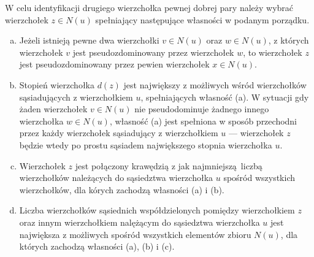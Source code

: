 {\begin{definition}
    W celu identyfikacji drugiego wierzchołka pewnej dobrej pary należy wybrać wierzchołek $z \in N(u)$ spełniający następujące własności w podanym porządku.
    \begin{enumerate}[(a)]
      \item Jeżeli istnieją pewne dwa wierzchołki $v \in N(u)$ oraz $w \in N(u)$, z których wierzchołek $v$ jest pseudozdominowany przez wierzchołek $w$, to wierzchołek $z$ jest pseudozdominowany przez pewien wierzchołek $x \in N(u)$.
      \item Stopień wierzchołka $d(z)$ jest największy z możliwych wśród wierzchołków sąsiadujących z wierzchołkiem $u$, spełniających własność (a).
      W sytuacji gdy żaden wierzchołek $v \in N(u)$ nie pseudodominuje żadnego innego wierzchołka $w \in N(u)$, własność (a) jest spełniona w sposób przechodni przez każdy wierzchołek sąsiadujący z wierzchołkiem $u$ --- wierzchołek $z$ będzie wtedy po prostu sąsiadem największego stopnia wierzchołka $u$.
      \item Wierzchołek $z$ jest połączony krawędzią z jak najmniejszą liczbą wierzchołków należących do sąsiedztwa wierzchołka $u$ spośród wszystkich wierzchołków, dla kórych zachodzą własności (a) i (b).
      \item Liczba wierzchołków sąsiednich współdzielonych pomiędzy wierzchołkiem $z$ oraz innym wierzchołkiem nalężącym do sąsiedztwa wierzchołka $u$ jest największa z możliwych spośród wszystkich elementów zbioru $N(u)$, dla których zachodzą własności (a), (b) i (c).
    \end{enumerate}
  \end{definition}
}
